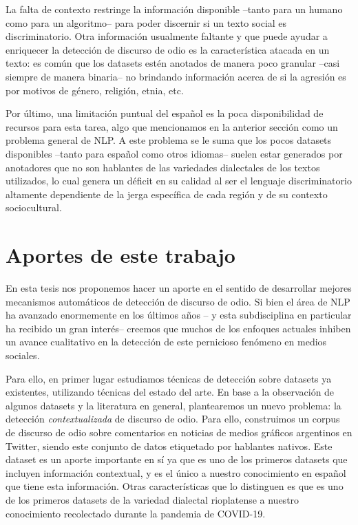 La falta de contexto restringe la información disponible --tanto para un humano como para un algoritmo-- para poder discernir si un texto social es discriminatorio. Otra información usualmente faltante y que puede ayudar a enriquecer la detección de discurso de odio es la característica atacada en un texto: es común que los datasets estén anotados de manera poco granular --casi siempre de manera binaria-- no brindando información acerca de si la agresión es por motivos de género, religión, etnia, etc.

Por último, una limitación puntual del español es la poca disponibilidad de recursos para esta tarea, algo que mencionamos en la anterior sección como un problema general de NLP. A este problema se le suma que los pocos datasets disponibles --tanto para español como otros idiomas-- suelen estar generados por anotadores que no son hablantes de las variedades dialectales de los textos utilizados, lo cual genera un déficit en su calidad al ser el lenguaje discriminatorio altamente dependiente de la jerga específica de cada región y de su contexto sociocultural.


\section{Aportes de este trabajo}

En esta tesis nos proponemos hacer un aporte en el sentido de desarrollar mejores mecanismos automáticos de detección de discurso de odio. Si bien el área de NLP ha avanzado enormemente en los últimos años -- y esta subdisciplina en particular ha recibido un gran interés-- creemos que muchos de los enfoques actuales inhiben un avance cualitativo en la detección de este pernicioso fenómeno en medios sociales.

Para ello, en primer lugar estudiamos técnicas de detección sobre datasets ya existentes, utilizando técnicas del estado del arte. En base a la observación de algunos datasets y la literatura en general, plantearemos un nuevo problema: la detección \emph{contextualizada} de discurso de odio. Para ello, construimos un corpus de discurso de odio sobre comentarios en noticias de medios gráficos argentinos en Twitter, siendo este conjunto de datos etiquetado por hablantes nativos. Este dataset es un aporte importante en sí ya que es uno de los primeros datasets que incluyen información contextual, y es el único a nuestro conocimiento en español que tiene esta información. Otras características que lo distinguen es que es uno de los primeros datasets de la variedad dialectal rioplatense a nuestro conocimiento recolectado durante la pandemia de COVID-19.

